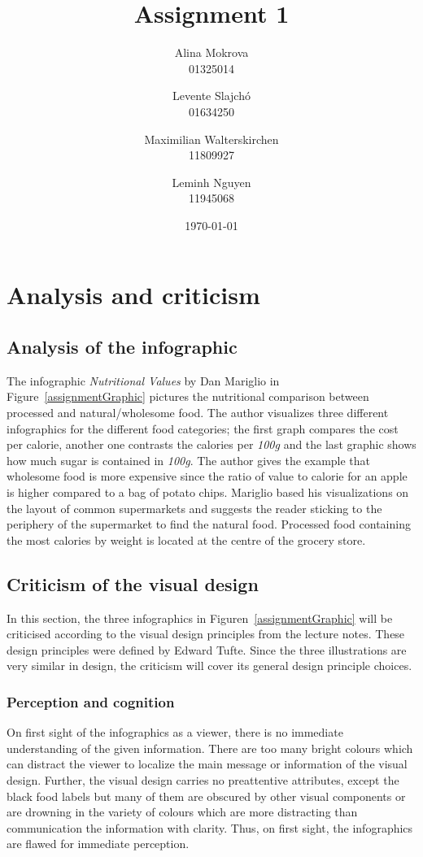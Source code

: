 \documentclass[a4paper, 11pt]{scrartcl}
\title{Assignment 1}
\author{Alina Mokrova\\
				01325014
				\and
				Levente	Slajchó\\
				01634250
				\and
				Maximilian Walterskirchen\\
				11809927
				\and
				Leminh Nguyen\\
				11945068}
\date{\today}
\begin{document}
\maketitle

\section{Analysis and criticism}

\subsection{Analysis of the infographic}

The infographic \textit{Nutritional Values} by Dan Mariglio in
Figure~\ref{assignmentGraphic} pictures the nutritional comparison between
processed and natural/wholesome food. The author visualizes three different
infographics for the different food categories; the first graph compares the
cost per calorie, another one contrasts the calories per \textit{100g} and the
last graphic shows how much sugar is contained in \textit{100g}. The author
gives the example that wholesome food is more expensive since the ratio of value
to calorie for an apple is higher compared to a bag of potato chips. Mariglio
based his visualizations on the layout of common supermarkets and suggests the
reader sticking to the periphery of the supermarket to find the natural food.
Processed food containing the most calories by weight is located at the centre
of the grocery store.

\subsection{Criticism of the visual design}

In this section, the three infographics in Figuren~\ref{assignmentGraphic} will
be criticised according to the visual design principles from the lecture notes.
These design principles were defined by Edward Tufte\cite{Tufte2001}. Since the
three illustrations are very similar in design, the criticism will cover its
general design principle choices.

\subsubsection{Perception and cognition}


On first sight of the infographics as a viewer, there is no immediate
understanding of the given information. There are too many bright colours which
can distract the viewer to localize the main message or information of the
visual design. Further, the visual design carries no preattentive attributes,
except the black food labels but many of them are obscured by other visual
components or are drowning in the variety of colours which are more distracting
than communication the information with clarity.  Thus, on first sight, the
infographics are flawed for immediate perception.
\end{document}
